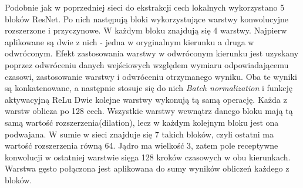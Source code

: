\documentclass[a4paper,11pt,twoside]{report}
\theoremstyle{definition}
\begin{document}
Podobnie jak w poprzedniej sieci do ekstrakcji cech lokalnych wykorzystano 5 bloków ResNet. Po nich następują bloki wykorzystujące warstwy konwolucyjne rozszerzone i przyczynowe. W każdym bloku znajdują się 4 warstwy. Najpierw aplikowane są dwie z nich - jedna w oryginalnym kierunku a druga w odwróconym. Efekt zastosowania warstwy w odwróconym kierunku jest uzyskany poprzez odwróceniu danych wejściowych względem wymiaru odpowiadającemu czasowi, zastosowanie warstwy i odwróceniu otrzymanego wyniku. Oba te wyniki są konkatenowane, a następnie stosuje się do nich \textit{Batch normalization} i funkcję aktywacyjną ReLu Dwie kolejne warstwy wykonują tą samą operację. Każda z warstw oblicza po 128 cech. Wszystkie warstwy wewnątrz danego bloku mają tą samą wartość rozszerzenia(dilation), lecz w każdym kolejnym bloku jest ona podwajana. W sumie w sieci znajduje się 7 takich bloków, czyli ostatni ma wartość rozszerzenia równą 64. Jądro ma wielkość 3, zatem pole receptywne konwolucji w ostatniej warstwie sięga 128 kroków czasowych w obu kierunkach. Warstwa gęsto połączona jest aplikowana do sumy wyników obliczeń każdego z bloków.
\end{document}
